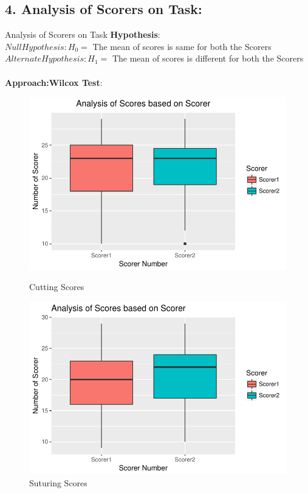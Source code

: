 \documentclass[12pt,epsf]{report}
\begin{document}
\subsection*{4. Analysis of Scorers on Task:}
 {Analysis of Scorers on Task}
\textbf{Hypothesis}:\\
$Null Hypothesis : H_0 = $ The mean of scores is same for both the Scorers\\
$Alternate Hypothesis : H_1 = $ The  mean of scores is different for both the Scorers\\
\\
\textbf{Approach:Wilcox Test}:\\
\begin{figure}[!htb]
	\begin{minipage}[c]{0.5\linewidth}
	\includegraphics[width=\linewidth]{Cutting_ScorerVsScore.pdf}
	\caption{ Cutting Scores}
	\end{minipage}
	\hfill
	\begin{minipage}[c]{0.5\linewidth}
	\includegraphics[width=\linewidth]{Suturing_ScorerVsScore.pdf}
	\caption{Suturing Scores}
	\end{minipage}
\end{figure}
\end{document}
